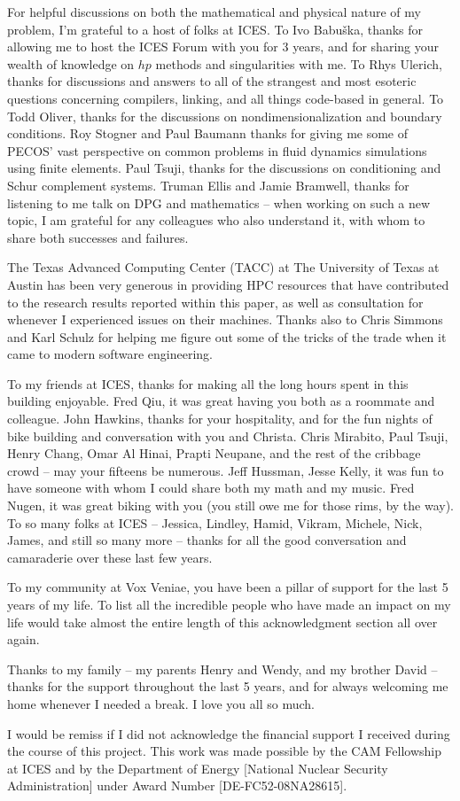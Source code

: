 For helpful discussions on both the mathematical and physical nature of my problem, I'm grateful to a host of folks at ICES.  To Ivo Babu\v{s}ka, thanks for allowing me to host the ICES Forum with you for 3 years, and for sharing your wealth of knowledge on $hp$ methods and singularities with me.  To Rhys Ulerich, thanks for discussions and answers to all of the strangest and most esoteric questions concerning compilers, linking, and all things code-based in general.  To Todd Oliver, thanks for the discussions on nondimensionalization and boundary conditions.  Roy Stogner and Paul Baumann thanks for giving me some of PECOS' vast perspective on common problems in fluid dynamics simulations using finite elements.  Paul Tsuji, thanks for the discussions on conditioning and Schur complement systems.  Truman Ellis and Jamie Bramwell, thanks for listening to me talk on DPG and mathematics -- when working on such a new topic, I am grateful for any colleagues who also understand it, with whom to share both successes and failures.  

The Texas Advanced Computing Center (TACC) at The University of Texas at Austin has been very generous in providing HPC resources that have contributed to the research results reported within this paper, as well as consultation for whenever I experienced issues on their machines.  Thanks also to Chris Simmons and Karl Schulz for helping me figure out some of the tricks of the trade when it came to modern software engineering.  

To my friends at ICES, thanks for making all the long hours spent in this building enjoyable.  Fred Qiu, it was great having you both as a roommate and colleague.  John Hawkins, thanks for your hospitality, and for the fun nights of bike building and conversation with you and Christa.  Chris Mirabito, Paul Tsuji, Henry Chang, Omar Al Hinai, Prapti Neupane, and the rest of the cribbage crowd -- may your fifteens be numerous.  Jeff Hussman, Jesse Kelly, it was fun to have someone with whom I could share both my math and my music.  Fred Nugen, it was great biking with you (you still owe me for those rims, by the way).  To so many folks at ICES -- Jessica, Lindley, Hamid, Vikram, Michele, Nick, James, and still so many more -- thanks for all the good conversation and camaraderie over these last few years.  

To my community at Vox Veniae, you have been a pillar of support for the last 5 years of my life.  To list all the incredible people who have made an impact on my life would take almost the entire length of this acknowledgment section all over again.  

Thanks to my family -- my parents Henry and Wendy, and my brother David -- thanks for the support throughout the last 5 years, and for always welcoming me home whenever I needed a break.  I love you all so much.  

I would be remiss if I did not acknowledge the financial support I received during the course of this project.  This work was made possible by the CAM Fellowship at ICES and by
the Department of Energy [National Nuclear Security Administration] under Award Number [DE-FC52-08NA28615].  